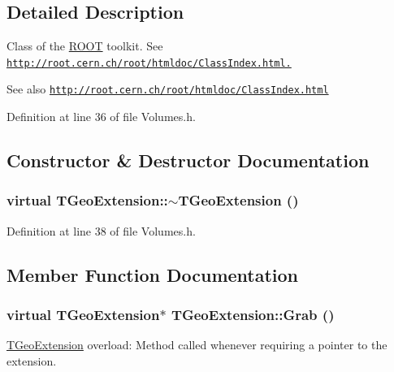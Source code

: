 \subsection{Detailed Description}
Class of the \hyperlink{namespace_r_o_o_t}{ROOT} toolkit. See \href{http://root.cern.ch/root/htmldoc/ClassIndex.html.}{\tt http://root.cern.ch/root/htmldoc/ClassIndex.html.} \begin{DoxySeeAlso}{See also}
\href{http://root.cern.ch/root/htmldoc/ClassIndex.html}{\tt http://root.cern.ch/root/htmldoc/ClassIndex.html} 
\end{DoxySeeAlso}


Definition at line 36 of file Volumes.h.

\subsection{Constructor \& Destructor Documentation}
\hypertarget{class_t_geo_extension_a07855c18b6678a4f6f4f125b85727fa1}{
\subsubsection[{$\sim$TGeoExtension}]{\setlength{\rightskip}{0pt plus 5cm}virtual TGeoExtension::$\sim$TGeoExtension ()}}
\label{class_t_geo_extension_a07855c18b6678a4f6f4f125b85727fa1}


Definition at line 38 of file Volumes.h.

\subsection{Member Function Documentation}
\hypertarget{class_t_geo_extension_addd8a323d93527519b94e2db3acbf9d5}{
\subsubsection[{Grab}]{\setlength{\rightskip}{0pt plus 5cm}virtual {\bf TGeoExtension}$\ast$ TGeoExtension::Grab ()}}
\label{class_t_geo_extension_addd8a323d93527519b94e2db3acbf9d5}


\hyperlink{class_t_geo_extension}{TGeoExtension} overload: Method called whenever requiring a pointer to the extension. 

